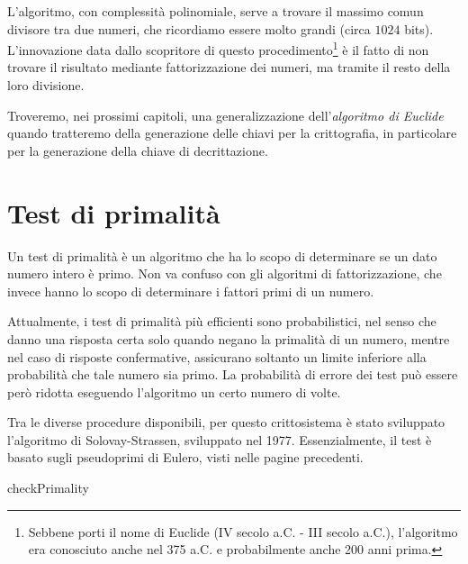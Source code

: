L'algoritmo, con complessità polinomiale, serve a trovare il massimo comun divisore tra due numeri, che ricordiamo essere molto grandi (circa $1024$ bits). L'innovazione data dallo scopritore di questo procedimento\footnote{Sebbene porti il nome di Euclide (IV secolo a.C. - III secolo a.C.), l'algoritmo era conosciuto anche nel 375 a.C. e probabilmente anche 200 anni prima.} è il fatto di non trovare il risultato mediante fattorizzazione dei numeri, ma tramite il resto della loro divisione.

Troveremo, nei prossimi capitoli, una generalizzazione dell'\emph{algoritmo di Euclide} quando tratteremo della generazione delle chiavi per la crittografia, in particolare per la generazione della chiave di decrittazione.\clearpage

%
%
\section{Test di primalità}
%
%

Un test di primalità è un algoritmo che ha lo scopo di determinare se un dato numero intero è primo. Non va confuso con gli algoritmi di fattorizzazione, che invece hanno lo scopo di determinare i fattori primi di un numero.

Attualmente, i test di primalità più efficienti sono probabilistici, nel senso che danno una risposta certa solo quando negano la primalità di un numero, mentre nel caso di risposte confermative, assicurano soltanto un limite inferiore alla probabilità che tale numero sia primo. La probabilità di errore dei test può essere però ridotta eseguendo l'algoritmo un certo numero di volte.

Tra le diverse procedure disponibili, per questo crittosistema è stato sviluppato l'algoritmo di Solovay-Strassen, sviluppato nel 1977. Essenzialmente, il test è basato sugli pseudoprimi di Eulero, visti nelle pagine precedenti.

\begin{algorithm}[H]
	\caption{checkPrimality}
	\label{alg:checkPrimality}
	\DontPrintSemicolon
\end{algorithm}

